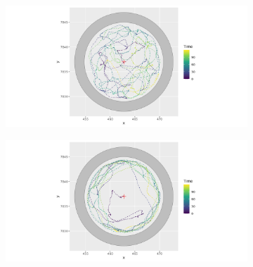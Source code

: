 \documentclass[11pt]{article}
\newcommand {\1}{\mathbb{1}}
\begin{document}
 \begin{figure}[H]
 	\centering
 	\begin{subfigure}{0.48\textwidth}
 		\centering
 		\includegraphics[scale=0.35]{images/crcvm/illustrative_sample_circ_standard}
 		\label{fig:illustrativesamplecircstandard}
 	\end{subfigure}
 	\begin{subfigure}{0.48\textwidth}
 		\centering
 		\includegraphics[scale=0.35]{images/crcvm/illustrative_sample_circ_pers}
 		\label{fig:illustrativesamplecircpers}
 	\end{subfigure}
 	

\end{figure}
\end{document}
